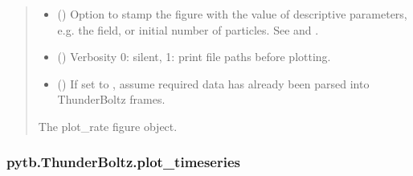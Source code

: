 \documentclass[letterpaper,10pt,english,openany,oneside]{sphinxmanual}
\begin{document}
\begin{fulllineitems}
\begin{fulllineitems}
\begin{quote}
\begin{description}
\begin{itemize}
\item {} 
\sphinxAtStartPar
{} (\sphinxstyleliteralemphasis{\sphinxupquote{{[}}}\sphinxstyleliteralemphasis{\sphinxupquote{{]}}}) \textendash{} Option to stamp the figure with the value of
descriptive parameters, e.g. the field, or initial
number of particles. See {\hyperref[\detokenize{api/pytb.parameters.TBParameters:pytb.parameters.TBParameters}]{}}
and {\hyperref[\detokenize{api/pytb.parameters.WrapParameters:pytb.parameters.WrapParameters}]{}}.

\item {} 
\sphinxAtStartPar
{} () \textendash{} Verbosity \textendash{} 0: silent, 1: print file paths before
plotting.

\item {} 
\sphinxAtStartPar
{} () \textendash{} If set to , assume required data has
already been parsed into ThunderBoltz frames.

\end{itemize}

\sphinxAtStartPar
The plot\_rate figure object.

\sphinxAtStartPar
{}

\end{description}\end{quote}

\end{fulllineitems}


\sphinxstepscope


\subsubsection{pytb.ThunderBoltz.plot\_timeseries}
\label{\detokenize{api/pytb.ThunderBoltz.plot_timeseries:pytb-thunderboltz-plot-timeseries}}\label{\detokenize{api/pytb.ThunderBoltz.plot_timeseries::doc}}


\end{fulllineitems}
\end{document}
